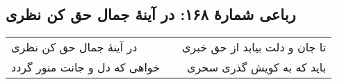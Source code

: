 \begin{center}
\section*{رباعی شمارهٔ ۱۶۸: در آینۀ جمال حق کن نظری}
\label{sec:168}
\begin{longtable}{l p{0.5cm} r}
در آینهٔ جمال حق کن نظری
&&
تا جان و دلت بیابد از حق خبری
\\
خواهی که دل و جانت منور گردد
&&
باید که به کویش گذری سحری
\\
\end{longtable}
\end{center}
